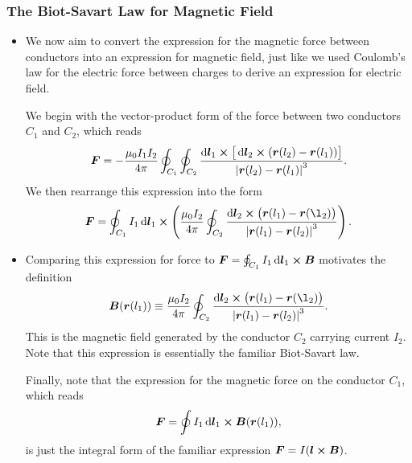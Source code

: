 \documentclass[11pt, a4paper]{article}
\newcommand{\diff}{\mathop{}\!\mathrm{d}} %
\renewcommand{\vec}[1]{\bm{#1}} %
\renewcommand{\r}{\vec{r}}
\newcommand{\B}{\vec{B}} %
\newcommand{\mm}{\mu_{0}}  %
\begin{document}
\subsubsection{The Biot-Savart Law for Magnetic Field}
\begin{itemize}
	\item We now aim to convert the expression for the magnetic force between conductors into an expression for magnetic field, just like we used Coulomb's law for the electric force between charges to derive an expression for electric field. 
	
	We begin with the vector-product form of the force between two conductors $ C_{1} $ and $ C_{2} $, which reads
	\begin{equation*}
		\vec{F} = - \frac{\mm I_{1}I_{2}}{4\pi}\oint_{C_{1}}\oint_{C_{2}} \frac{\diff \vec{l}_{1}\cross \big[\diff \vec{l}_{2} \cross (\r(l_{2}) - \r(l_{1}) )\big]}{\abs{\r(l_{2}) - \r(l_{1})}^{3}}.
	\end{equation*}
    We then rearrange this expression into the form
	\begin{equation*}
		\vec{F} = \oint_{C_{1}}I_{1}\diff \vec{l}_{1}\cross \left(\frac{\mm I_{2}}{4\pi} \oint_{C_{2}}\frac{\diff \vec{l}_{2} \cross \big(\r(l_{1}) - \r(\l_{2})\big)}{\abs{\r(l_{1}) - \r(l_{2})}^{3}}\right).
	\end{equation*}
	
    \item Comparing this expression for force to $ \vec{F} = \oint_{C_{1}} I_{1} \diff \vec{l}_{1} \cross \B $ motivates the definition
	\begin{equation*}
		\B(\r(l_{1})) \equiv \frac{\mm I_{2}}{4\pi} \oint_{C_{2}}\frac{\diff \vec{l}_{2} \cross \big(\r(l_{1}) - \r(\l_{2})\big)}{\abs{\r(l_{1}) - \r(l_{2})}^{3}}.
	\end{equation*}
	This is the magnetic field generated by the conductor $ C_{2} $ carrying current $ I_{2} $. Note that this expression is essentially the familiar Biot-Savart law. 

    Finally, note that the expression for the magnetic force on the conductor $ C_{1} $, which reads
	\begin{equation*}
		\vec{F} = \oint I_{1}\diff \vec{l}_{1} \cross \B(\r(l_{1})),
	\end{equation*}
	is just the integral form of the familiar expression $ \vec{F} = I (\vec{l}\cross \vec{B}) $. 
	

\end{itemize}
\end{document}
